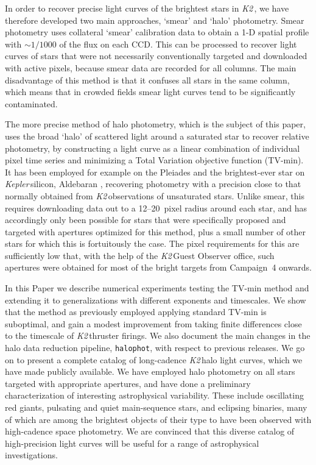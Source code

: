 \documentclass[modern]{aastex62}
\newcommand\kepler{\emph{Kepler}\,}
\newcommand\ktwo{\emph{K2}\,}
\begin{document}
In order to recover precise light curves of the brightest stars in \ktwo, we have therefore developed two main approaches, `smear' and `halo' photometry. Smear photometry \citep{Pope2016,smearcampaign} uses collateral `smear' calibration data to obtain a 1-D spatial profile with $\sim 1/1000$ of the flux on each CCD. This can be processed to recover light curves of stars that were not necessarily conventionally targeted and downloaded with active pixels, because smear data are recorded for all columns. The main disadvantage of this method is that it confuses all stars in the same column, which means that in crowded fields smear light curves tend to be significantly contaminated. 

The more precise method of halo photometry, which is the subject of this paper, uses the broad `halo' of scattered light around a saturated star to recover relative photometry, by constructing a light curve as a linear combination of individual pixel time series and minimizing a Total Variation objective function (TV-min). It has been employed for example on the Pleiades \citep{White2017} and the brightest-ever star on \kepler silicon, Aldebaran \citep[$\alpha$\,Tau;][]{Farr2018}, recovering photometry with a precision close to that normally obtained from \ktwo observations of unsaturated stars. Unlike smear, this requires downloading data out to a 12--20~pixel radius around each star, and has accordingly only been possible for stars that were specifically proposed and targeted with apertures optimized for this method, plus a small number of other stars for which this is fortuitously the case. The pixel requirements for this are sufficiently low that, with the help of the \ktwo Guest Observer office, such apertures were obtained for most of the bright targets from Campaign~4 onwards.

In this Paper we describe numerical experiments testing the TV-min method and extending it to generalizations with different exponents and timescales. We show that the method as previously employed applying standard TV-min is suboptimal, and gain a modest improvement from taking finite differences close to the timescale of \ktwo thruster firings. We also document the main changes in the halo data reduction pipeline, \texttt{halophot}, with respect to previous releases. 
We go on to present a complete catalog of long-cadence \ktwo halo light curves, which we have made publicly available. We have employed halo photometry on all stars targeted with appropriate apertures, and have done a preliminary characterization of interesting astrophysical variability. These include oscillating red giants, pulsating and quiet main-sequence stars, and eclipsing binaries, many of which are among the brightest objects of their type to have been observed with high-cadence space photometry. We are convinced that this diverse catalog of high-precision light curves will be useful for a range of astrophysical investigations. 
\end{document}
